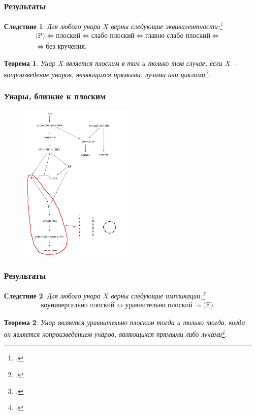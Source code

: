 \documentclass[11pt, notheorems]{beamer}
\newtheorem{theorem}{Теорема}
\newtheorem{corollary}{Следствие}
\begin{document}
\begin{frame}
	\frametitle{Результаты}

	\begin{corollary}
		Для любого унара $X$ верны следующие эквивалентности:\footcite[следствие 3]{pryan:unars_close_to_flat}
		\begin{multline*}
			\text{(P)} \Leftrightarrow \text{плоский} \Leftrightarrow \text{слабо плоский} \Leftrightarrow \text{главно слабо плоский} \Leftrightarrow \\
			\Leftrightarrow \text{без кручения}.
		\end{multline*}
	\end{corollary}

	\begin{theorem}
		Унар $X$ является плоским в том и только том случае, если $X$ -- копроизведение унаров, являющихся прямыми, лучами или циклами\footcite[теорема]{flat_unars}.
	\end{theorem}
\end{frame}

\begin{frame}
	\frametitle{Унары, близкие к плоским}

	\begin{figure}
		\center
		\includegraphics[width=0.5\textwidth]{overview_3.png}
	\end{figure}
\end{frame}

\begin{frame}
	\frametitle{Результаты}

	\begin{corollary}
		Для любого унара $X$ верны следующие импликации:\footcite[следствие 4]{pryan:unars_close_to_flat}
		\begin{gather*}
			\text{коуниверсально плоский} \Leftrightarrow \text{уравнительно плоский} \Rightarrow \text{(E)}.
		\end{gather*}
	\end{corollary}

	\begin{theorem}
		Унар является уравнительно плоским тогда и только тогда, когда он является копроизведением унаров, являющихся прямыми либо лучами\footcite[теорема 3]{pryan:unars_close_to_flat}.
	\end{theorem}
\end{frame}
\end{document}
